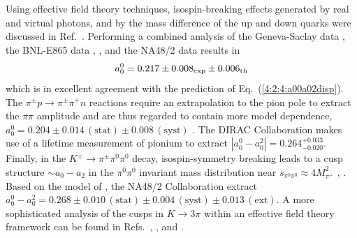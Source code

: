 \documentclass[twoside,12pt]{article}
\begin{document}
   Using effective field theory techniques, isospin-breaking effects generated
by real and virtual photons, and by the mass difference of the up and down quarks
were discussed in Ref.~\cite{Colangelo:2008sm}.
   Performing a combined analysis of the Geneva-Saclay data \cite{Rosselet:1976pu},
the BNL-E865 data \cite{Pislak:2001bf:3}, \cite{Pislak:2003sv}, and the
NA48/2 data \cite{Batley:2007zz} results in
\cite{Colangelo:2008sm}
\begin{equation}
\label{4:10:swslexpold}
a_0^0=0.217\pm 0.008_{\rm exp} \pm 0.006_{\rm th}
\end{equation}
which is in excellent agreement with the prediction of Eq.~(\ref{4:2:4:a00a02disp}).
   The $\pi^\pm p\to \pi^\pm \pi^+ n$ reactions require an extrapolation to the pion
pole to extract the $\pi\pi$ amplitude
and are thus regarded to contain more model dependence,
$a_0^0=0.204\pm 0.014\, (\mbox{stat}) \pm 0.008\, (\mbox{syst})$
\cite{Kermani:1998gq}.
   The DIRAC Collaboration \cite{Adeva:2005pg} makes use of a lifetime measurement of
pionium to extract $|a_0^0-a_0^2|=0.264^{+0.033}_{-0.020}$.
   Finally, in the $K^\pm\to\pi^\pm\pi^0\pi^0$ decay, isospin-symmetry breaking
leads to a cusp structure $\sim a_0-a_2$ in the $\pi^0\pi^0$ invariant mass distribution
near $s_{\pi^0\pi^0}\approx 4M_{\pi^+}^2$ \cite{Cabibbo:2004gq},
\cite{Cabibbo:2005ez}.
   Based on the model of \cite{Cabibbo:2005ez}, the
NA48/2 Collaboration extract $a_0^0-a_0^2=0.268\pm 0.010\,(\mbox{stat})\pm 0.004\,(\mbox{syst})
\pm 0.013\,(\mbox{ext})$.
   A more sophisticated analysis of the cusps in $K\to 3\pi$ within an effective
   field theory framework can be found in Refs.~\cite{Colangelo:2006va}, \cite{Bissegger:2007yq},
   and \cite{Bissegger:2008ff}.
\end{document}
